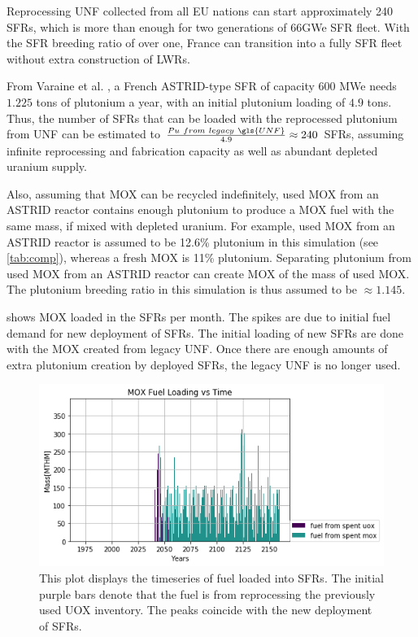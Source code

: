 Reprocessing \gls{UNF} collected from all EU nations can start approximately
240 \glspl{SFR}, which is more than enough for two generations of 66GWe \gls{SFR}
fleet. With the \gls{SFR} breeding ratio of over one, France can transition into
a fully \gls{SFR} fleet without extra construction of \glspl{LWR}. 

From Varaine et al. \cite{varaine_pre-conceptual_2012}, a French
ASTRID-type \gls{SFR} of capacity 600 MWe needs $1.225$ tons of
plutonium a year, with an initial plutonium loading of $4.9$ tons. 
Thus, the number of \glspl{SFR} that can be loaded with the reprocessed
plutonium from \gls{UNF} can be estimated to $\frac{Pu \ from \ legacy \ \gls{UNF}}{4.9} \approx 240$ \glspl{SFR},
assuming infinite reprocessing and fabrication capacity as well as
abundant depleted uranium supply. 

Also, assuming that \gls{MOX} can be recycled indefinitely,
used \gls{MOX} from an ASTRID reactor contains enough plutonium to produce a \gls{MOX} fuel with
the same mass, if mixed with depleted uranium. For example,
used \gls{MOX} from an ASTRID reactor is assumed to be 12.6\% plutonium
in this simulation (see \cref{tab:comp}), whereas a fresh \gls{MOX} is 11\% plutonium.
Separating plutonium from used \gls{MOX} from
an ASTRID reactor can create \gls{MOX} of the mass of used \gls{MOX}.
The plutonium breeding ratio in this simulation is thus assumed to be
$\approx 1.145$.

 shows \gls{MOX} loaded in the \glspl{SFR} per month.
The spikes are due to initial fuel demand for new deployment of \glspl{SFR}.
The initial loading of new \glspl{SFR} are done with the \gls{MOX} created
from legacy \gls{UNF}. Once there are enough amounts of extra plutonium creation
by deployed \glspl{SFR}, the legacy \gls{UNF} is no longer used. 

\begin{figure}[htbp!]
	\begin{center}
		\includegraphics[scale=0.7]{./images/french-transition/where_fuel.png}
	\end{center}
	\caption{This plot displays the timeseries of fuel loaded into \glspl{SFR}.
			 The initial purple bars denote that the fuel is from reprocessing
			 the previously used \gls{UOX} inventory. The peaks coincide
			 with the new deployment of \glspl{SFR}.}
	\label{fig:fuel}
\end{figure}

